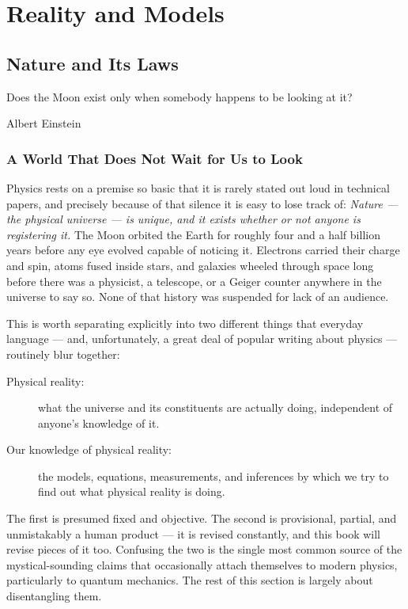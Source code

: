 \chapter{Reality and Models}
\label{models}

\section{Nature and Its Laws}

\epigraph{Does the Moon exist only when somebody happens to be looking at it? }{Albert Einstein}

\subsection{A World That Does Not Wait for Us to Look}

Physics rests on a premise so basic that it is rarely stated out loud in
technical papers, and precisely because of that silence it is easy to lose
track of: \emph{Nature --- the physical universe --- is unique, and it
exists whether or not anyone is registering it.} The Moon orbited the Earth
for roughly four and a half billion years before any eye evolved capable of
noticing it. Electrons carried their charge and spin, atoms fused inside
stars, and galaxies wheeled through space long before there was a physicist,
a telescope, or a Geiger counter anywhere in the universe to say so. None of
that history was suspended for lack of an audience.

This is worth separating explicitly into two different things that everyday
language --- and, unfortunately, a great deal of popular writing about
physics --- routinely blur together:
\begin{description}
    \item [Physical reality:] what the universe and its constituents
  are actually doing, independent of anyone's knowledge of it.
    \item [ Our knowledge of physical reality:] the models, equations,
  measurements, and inferences by which we try to find out what physical
  reality is doing.
\end{description}

\noindent The first is presumed fixed and objective. The second is
provisional, partial, and unmistakably a human product --- it is revised
constantly, and this book will revise pieces of it too. Confusing the two is
the single most common source of the mystical-sounding claims that
occasionally attach themselves to modern physics, particularly to quantum
mechanics. The rest of this section is largely about disentangling them.


